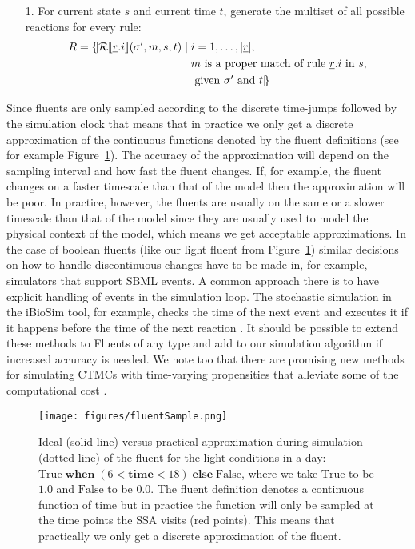 \begin{itemize}
\item[1.]  For current state  $s$ and current time $t$, 
 generate the multiset of all possible reactions for every rule:
 \begin{equation*}
 \begin{split}
R  = \{\!|  \mathcal{R}\llbracket \underline{r}.i \rrbracket(\sigma', m, s, t) \; | \; & i = 1,\ldots,|\underline{r}|, \\ 
                                 & m \mbox{ is a proper match of rule $\underline{r}.i$ in $s$}, \\ 
                                 & \mbox{ given $\sigma'$ and $t$} |\!\}
\end{split}
\end{equation*}
\end{itemize}

Since fluents are only sampled according to the discrete time-jumps followed by
the simulation clock that means that in practice we only get a discrete
approximation of the continuous functions denoted by the fluent definitions (see
for example Figure~\ref{fig:fluentSamp}). The accuracy of the approximation will
depend on the sampling interval and how fast the fluent changes. If, for
example, the fluent changes on a faster timescale than that of the model then
the approximation will be poor. In practice, however, the fluents are usually on
the same or a slower timescale than that of the model since they are usually
used to model the physical context of the model, which means we get acceptable
approximations. In the case of boolean fluents (like our light fluent from
Figure~\ref{fig:fluentSamp}) similar decisions on how to handle discontinuous
changes have to be made in, for example, simulators that support SBML events. A
common approach there is to have explicit handling of events in the simulation
loop. The stochastic simulation in the iBioSim tool, for example, checks the
time of the next event and executes it if it happens before the time of the next
reaction \citep[see][Algorithm 7]{watanabe_hierarchical_2014}. It should be
possible to extend these methods to Fluents of any type and add to our
simulation algorithm if increased accuracy is needed. We note too that there are
promising new methods for simulating CTMCs with time-varying propensities that
alleviate some of the computational cost \citep{voliotis_stochastic_2016}.

\begin{figure}[tb]
\centering
\texttt{[image: figures/fluentSample.png]}
\caption{ Ideal (solid line) versus practical approximation during simulation
  (dotted line) of the fluent for the light conditions in a day:
  $ \mathrm{True} \; \mathbf{when} \; (6 < \mathbf{time} < 18) \; \mathbf{else}
  \; \mathrm{False}$, where we take $\mathrm{True}$ to be $1.0$ and
  $\mathrm{False}$ to be $0.0$. The fluent definition denotes a continuous
  function of time but in practice the function will only be sampled at the time
  points the SSA visits (red points). This means that practically we only get a
  discrete approximation of the fluent.}
\label{fig:fluentSamp}
\end{figure}

